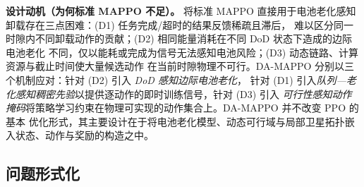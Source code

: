 \documentclass[a4paper,11pt]{article}
\begin{document}
\noindent\textbf{设计动机（为何标准 MAPPO 不足）。}
将标准 MAPPO 直接用于电池老化感知卸载存在三点困难：(D1) 任务完成/超时的结果反馈稀疏且滞后，
难以区分同一时隙内不同卸载动作的贡献；(D2) 相同能量消耗在不同 DoD 状态下造成的边际电池老化
不同，仅以能耗或完成为信号无法感知电池风险；(D3) 动态链路、计算资源与截止时间使大量候选动作
在当前时隙物理不可行。DA-MAPPO 分别以三个机制应对：针对 (D2) 引入 \emph{DoD 感知边际电池老化}，
针对 (D1) 引入\emph{队列—老化感知稠密先验}以提供逐动作的即时训练信号，针对 (D3) 引入
\emph{可行性感知动作掩码}将策略学习约束在物理可实现的动作集合上。DA-MAPPO 并不改变 PPO 的基本
优化形式，其主要设计在于将电池老化模型、动态可行域与局部卫星拓扑嵌入状态、动作与奖励的构造之中。

\subsection{问题形式化}
\label{subsec:problem}
\end{document}
